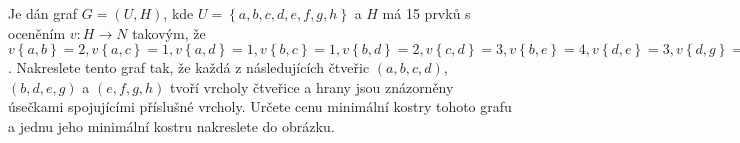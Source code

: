 \subsubsection{}
Je dán graf $G=(U,H)$, kde $U=\left \{a,b,c,d,e,f,g,h  \right \}$ a $H$ má 15
prvků s oceněním $v:H\rightarrow N$ takovým, že $v\left \{ a,b \right \}=2,
v\left \{ a,c \right \}=1, v\left \{ a,d \right \}=1, v\left \{ b,c \right \}=1,
v\left \{ b,d \right \}=2, v\left \{ c,d \right \}=3, v\left \{ b,e \right \}=4,
v\left \{ d,e \right \}=3, v\left \{ d,g \right \}=2, v\left \{ e,f \right \}=4,
v\left \{ e,g \right \}=3, v\left \{ e,h \right \}=2, v\left \{ f,g \right \}=3,
v\left \{ f,h \right \}=1, v\left \{ g,h \right \}=1$. Nakreslete tento graf
tak, že každá z následujících čtveřic $(a,b,c,d)$, $(b,d,e,g)$ a $(e,f,g,h)$ tvoří
vrcholy čtveřice a hrany  jsou znázorněny úsečkami spojujícími příslušné
vrcholy. Určete cenu minimální kostry tohoto grafu a jednu jeho minimální kostru
nakreslete do obrázku.
